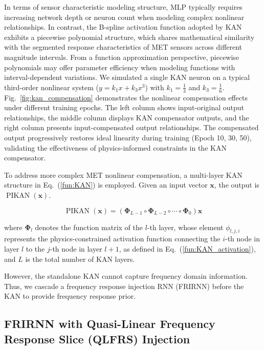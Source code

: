 \documentclass[journal]{IEEEtran}
\begin{document}
    In terms of sensor characteristic modeling structure, MLP typically requires increasing network depth or neuron count when modeling complex nonlinear relationships. In contrast, the B-spline activation function adopted by KAN exhibits a piecewise polynomial structure, which shares mathematical similarity with the segmented response characteristics of MET sensors across different magnitude intervals. From a function approximation perspective, piecewise polynomials may offer parameter efficiency when modeling functions with interval-dependent variations.
    We simulated a single KAN neuron on a typical third-order nonlinear system ($y = k_1 x + k_3 x^3$) with $k_1 = \frac{1}{3}$ and $k_3 = \frac{1}{6}$. Fig.~\ref{fig:kan_compensation} demonstrates the nonlinear compensation effects under different training epochs. The left column shows input-original output relationships, the middle column displays KAN compensator outputs, and the right column presents input-compensated output relationships. The compensated output progressively restores ideal linearity during training (Epoch 10, 30, 50), validating the effectiveness of physics-informed constraints in the KAN compensator.



    To address more complex MET nonlinear compensation, a multi-layer KAN structure in Eq.~(\ref{fun:KAN}) \cite{liu2025kankolmogorovarnoldnetworks} is employed. Given an input vector $\mathbf{x}$, the output is $\operatorname{PIKAN}(\mathbf{x})$.


\begin{equation}
    \operatorname{PIKAN}(\mathbf{x})  = \left( \bm{\Phi}_{L-1} \circ \bm{\Phi}_{L-2} \circ \cdots \circ \bm{\Phi}_0 \right) \mathbf{x}
    \label{fun:KAN}
\end{equation}

where $\bm{\Phi}_l$ denotes the function matrix of the $l$-th layer, whose element $\phi_{l,j,i}$ represents the physics-constrained activation function connecting the $i$-th node in layer $l$ to the $j$-th node in layer $l+1$, as defined in Eq.~(\ref{fun:KAN_activation}), and $L$ is the total number of KAN layers.



    However, the standalone KAN cannot capture frequency domain information. Thus, we cascade a frequency response injection RNN (FRIRNN) before the KAN to provide frequency response prior.


\subsection{FRIRNN with Quasi-Linear Frequency Response Slice (QLFRS) Injection}
\end{document}
